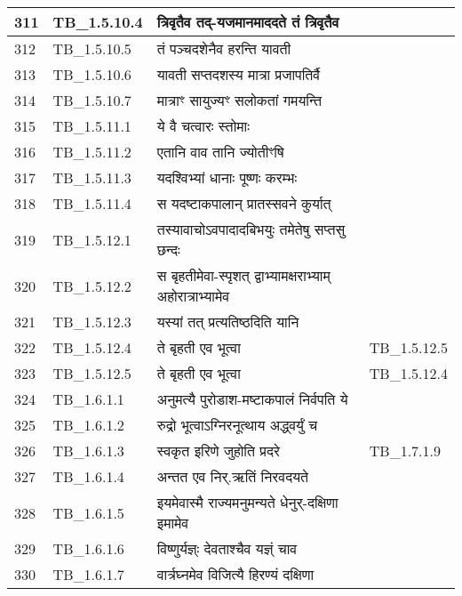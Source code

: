 \documentclass[17pt]{extarticle}
\begin{document}
\begin{longtable}{||p{0.4in}||p{0.9in}||p{4.0in}||p{0.9in}||}
            311 & TB\_1.5.10.4 & त्रिवृतैव तद्{-}यजमानमाददते तं त्रिवृतैव &      \\
        \hline
            312 & TB\_1.5.10.5 & तं पञ्चदशेनैव हरन्ति यावती &      \\
        \hline
            313 & TB\_1.5.10.6 & यावती सप्तदशस्य मात्रा प्रजापतिर्वै &      \\
        \hline
            314 & TB\_1.5.10.7 & मात्राꣳ सायुज्यꣳ सलोकतां गमयन्ति &      \\
        \hline
            315 & TB\_1.5.11.1 & ये वै चत्वारः स्तोमाः &      \\
        \hline
            316 & TB\_1.5.11.2 & एतानि वाव तानि ज्योतीꣳषि &      \\
        \hline
            317 & TB\_1.5.11.3 & यदश्विभ्यां धानाः पूष्णः करम्भः &      \\
        \hline
            318 & TB\_1.5.11.4 & स यदष्टाकपालान् प्रातस्सवने कुर्यात् &      \\
        \hline
            319 & TB\_1.5.12.1 & तस्यावाचोऽवपादादबिभयुः तमेतेषु सप्तसु छन्दः &      \\
        \hline
            320 & TB\_1.5.12.2 & स बृहतीमेवा{-}स्पृशत् द्वाभ्यामक्षराभ्याम् अहोरात्राभ्यामेव &      \\
        \hline
            321 & TB\_1.5.12.3 & यस्यां तत् प्रत्यतिष्ठदिति यानि &      \\
        \hline
            322 & TB\_1.5.12.4 & ते बृहती एव भूत्वा &  TB\_1.5.12.5       \\
        \hline
            323 & TB\_1.5.12.5 & ते बृहती एव भूत्वा & TB\_1.5.12.4        \\
        \hline
            324 & TB\_1.6.1.1 & अनुमत्यै पुरोडाश{-}मष्टाकपालं निर्वपति ये &      \\
        \hline
            325 & TB\_1.6.1.2 & रुद्रो भूत्वाऽग्निरनूत्थाय अद्ध्वर्युं च &      \\
        \hline
            326 & TB\_1.6.1.3 & स्वकृत इरिणे जुहोति प्रदरे &  TB\_1.7.1.9       \\
        \hline
            327 & TB\_1.6.1.4 & अन्तत एव निर्.ऋतिं निरवदयते &      \\
        \hline
            328 & TB\_1.6.1.5 & इयमेवास्मै राज्यमनुमन्यते धेनुर्{-}दक्षिणा इमामेव &      \\
        \hline
            329 & TB\_1.6.1.6 & विष्णुर्यज्ञ्ः देवताश्चैव यज्ञ्ं चाव &      \\
        \hline
            330 & TB\_1.6.1.7 & वार्त्रघ्नमेव विजित्यै हिरण्यं दक्षिणा &      \\

\end{longtable}
\end{document}
